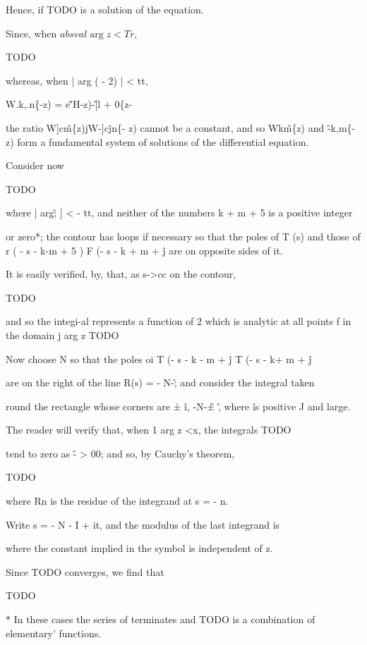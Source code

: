 Hence, if TODO is a solution of the equation.

Since, when $absval{\arg z} < Tr$,

TODO

whereas, when | arg ( - 2) | < tt,

W.k,.n\{-z) = e\^'H-z)-\^[l + 0\{z-%

the ratio W]c\^m\{z)jW-]c\^jn\{- z) cannot be a constant, and so
Wk\^m\{z) and \^-k,m\{- z) form a fundamental system of solutions of
the differential equation.


Consider now

TODO

where | arg\^; ] < - tt, and neither of the numbers k + m + 5 is a
positive integer

%
%

or zero*; the contour has loops if necessary so that the poles of T
(s) and those of r ( - s - k-m + 5 ) F (- s - k + m + \^j are on
opposite sides of it.

It is easily verified, by, that, as s->cc on the contour,

TODO

and so the integi-al represents a function of 2 which is analytic at
all points f in the domain j arg z TODO

Now choose N so that the poles oi T (- s - k - m + \^j T (- s - k+ m +
\^j

are on the right of the line R(s) = - N-\^; and consider the integral
taken

round the rectangle whose corners are ± \^i, -N-\^± \^, where \^ is
positive J and large.

The reader will verify that, when 1 arg z <x, the integrals TODO

tend to zero as \^- > 00; and so, by Cauchy's theorem,

TODO

where Rn is the residue of the integrand at s = - n.

Write s = - N - I + it, and the modulus of the last integrand is

where the constant implied in the symbol is independent of z.

Since TODO converges, we find that

TODO

* In these cases the series of terminates and TODO is a
combination of elementary' functions.

